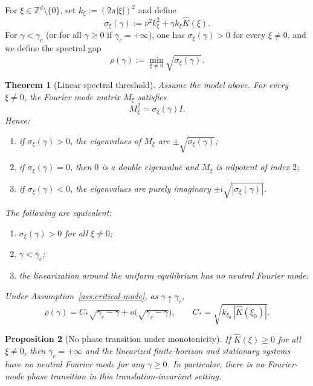 \documentclass[11pt]{amsart}
\newtheorem{theorem}{Theorem}[section]
\newtheorem{proposition}[theorem]{Proposition}
\theoremstyle{definition}
\theoremstyle{remark}
\newcommand{\Zd}{\mathbb{Z}^d}
\newcommand{\Kh}{\widehat{K}}
\newcommand{\gamc}{\gamma_c}
\begin{document}
For $\xi\in\Zd\setminus\{0\}$, set $k_\xi:=(2\pi|\xi|)^2$ and define
\begin{equation}
\label{eq:gap-xi}
\sigma_\xi(\gamma) := \nu^2 k_\xi^2+\gamma k_\xi \Kh(\xi).
\end{equation}
For $\gamma<\gamc$ (or for all $\gamma\ge 0$ if $\gamc=+\infty$), one has
$\sigma_\xi(\gamma)>0$ for every $\xi\neq 0$, and we define the spectral gap
\begin{equation}
\label{eq:global-gap}
\rho(\gamma):=\min_{\xi\neq 0}\sqrt{\sigma_\xi(\gamma)}.
\end{equation}

\begin{theorem}[Linear spectral threshold]
\label{thm:spectral-threshold}
Assume the model above. For every $\xi\neq 0$, the Fourier mode matrix $M_\xi$ satisfies
\[
M_\xi^2=\sigma_\xi(\gamma) I.
\]
Hence:
\begin{enumerate}[label=\textup{(\roman*)},leftmargin=2em]
\item if $\sigma_\xi(\gamma)>0$, the eigenvalues of $M_\xi$ are $\pm\sqrt{\sigma_\xi(\gamma)}$;
\item if $\sigma_\xi(\gamma)=0$, then $0$ is a double eigenvalue and $M_\xi$ is nilpotent of index $2$;
\item if $\sigma_\xi(\gamma)<0$, the eigenvalues are purely imaginary $\pm i\sqrt{|\sigma_\xi(\gamma)|}$.
\end{enumerate}
The following are equivalent:
\begin{enumerate}[label=\textup{(\roman*)},leftmargin=2em]
\item $\sigma_\xi(\gamma)>0$ for all $\xi\neq 0$;
\item $\gamma<\gamc$;
\item the linearization around the uniform equilibrium has no neutral Fourier mode.
\end{enumerate}
Under Assumption~\ref{ass:critical-mode}, as $\gamma\uparrow\gamc$,
\[
\rho(\gamma)
=
C_\ast\sqrt{\gamc-\gamma}+o\!\bigl(\sqrt{\gamc-\gamma}\bigr),
\qquad
C_\ast = \sqrt{k_{\xi_0}\,|\Kh(\xi_0)|}.
\]
\end{theorem}

\begin{proposition}[No phase transition under monotonicity]
\label{prop:no-transition}
If $\Kh(\xi)\ge 0$ for all $\xi\neq 0$, then $\gamc=+\infty$ and the linearized finite-horizon and stationary systems have no neutral Fourier mode for any $\gamma\ge 0$. In particular, there is no Fourier-mode phase transition in this translation-invariant setting.
\end{proposition}
\end{document}

